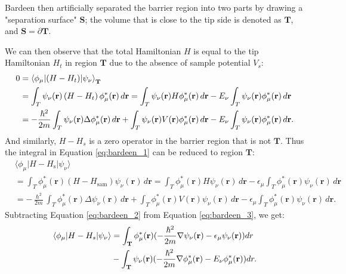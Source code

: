 Bardeen then artificially separated the barrier region into two parts by drawing a "separation surface" $\mathbf{S}$; the volume that is close to the tip side is denoted as $\mathbf{T}$, and $\mathbf{S} = \partial \mathbf{T}$.

We can then observe that the total Hamiltonian $H$ is equal to the tip Hamiltonian $H_t$ in region $\mathbf{T}$ due to the absence of sample potential $V_s$: 
\begin{equation}
	\label{eq:bardeen_2}
	\begin{aligned}
		0 &= \braket{\phi_{\mu}|(H-H_t)|\psi_{\nu}}_{\mathbf{T}}\\
		 &= \int_{T} \psi_{\nu}(\mathbf{r}) \left( H - H_{t} \right) \phi_{\mu}^*(\mathbf{r}) \, d\mathbf{r} 
		= \int_{T} \psi_{\nu}(\mathbf{r}) H \phi_{\mu}^*(\mathbf{r}) \, d\mathbf{r} 
		- E_{\nu} \int_{T} \psi_{\nu}(\mathbf{r}) \phi_{\mu}^*(\mathbf{r}) \, d\mathbf{r} \\
		&= -\frac{\hslash^2}{2m} \int_{T} \psi_{\nu}(\mathbf{r}) \Delta \phi_{\mu}^*(\mathbf{r}) \, d\mathbf{r} 
		+ \int_{T} \psi_{\nu}(\mathbf{r}) V(\mathbf{r}) \phi_{\mu}^*(\mathbf{r}) \, d\mathbf{r} 
		- E_{\nu} \int_{T} \psi_{\nu}(\mathbf{r}) \phi_{\mu}^*(\mathbf{r}) \, d\mathbf{r}.
	\end{aligned}
\end{equation}
And similarly, $H - H_s$ is a zero operator in the barrier region that is not $\mathbf{T}$. Thus the integral in Equation \ref{eq:bardeen_1} can be reduced to region $\mathbf{T}$:   
\begin{equation}
	\label{eq:bardeen_3}
	\begin{aligned}
		&\langle \phi_{\mu} | H - H_{\text{s}} | \psi_{\nu} \rangle \\
		&= \int_{T} \phi_{\mu}^*(\mathbf{r}) \left( H - H_{\text{sam}} \right) \psi_{\nu}(\mathbf{r}) \, d\mathbf{r} 
		= \int_{T} \phi_{\mu}^*(\mathbf{r}) H \psi_{\nu}(\mathbf{r}) \, d\mathbf{r} 
		- \epsilon_{\mu} \int_{T} \phi_{\mu}^*(\mathbf{r}) \psi_{\nu}(\mathbf{r}) \, d\mathbf{r} \\
		&= -\frac{\hslash^2}{2m} \int_{T} \phi_{\mu}^*(\mathbf{r}) \Delta \psi_{\nu}(\mathbf{r}) \, d\mathbf{r} 
		+ \int_{T} \phi_{\mu}^*(\mathbf{r}) V(\mathbf{r}) \psi_{\nu}(\mathbf{r}) \, d\mathbf{r} 
		- \epsilon_{\mu} \int_{T} \phi_{\mu}^*(\mathbf{r}) \psi_{\nu}(\mathbf{r}) \, d\mathbf{r}.
	\end{aligned}
\end{equation}
Subtracting Equation \ref{eq:bardeen_2} from Equation \ref{eq:bardeen_3}, we get: 
\begin{equation}
	\label{eq:bardeen_matrixelement}
	\begin{aligned}
		\braket{\phi_{\mu}|H-H_s|\psi_{\nu}} &= \int_\mathbf{T}\phi_{\mu}^*(\mathbf{r})(-\frac{\hslash^2}{2m} \nabla \psi_{\nu}(\mathbf{r}) - \epsilon_{\mu}\psi_{\nu}(\mathbf{r}))dr \\ 
		& - \int_\mathbf{T}\psi_{\nu}(\mathbf{r})(-\frac{\hslash^2}{2m} \nabla \phi_{\mu}^*(\mathbf{r}) - E_{\nu}\phi_{\mu}^*(\mathbf{r}))dr.
	\end{aligned}
\end{equation}
